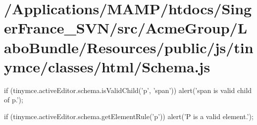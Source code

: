 \hypertarget{_2_applications_2_m_a_m_p_2htdocs_2_singer_france__s_v_n_2src_2_acme_group_2_labo_bundle_2_resou8e3613b62b7b0350ec49055cd0ec1f72}{\section{/\+Applications/\+M\+A\+M\+P/htdocs/\+Singer\+France\+\_\+\+S\+V\+N/src/\+Acme\+Group/\+Labo\+Bundle/\+Resources/public/js/tinymce/classes/html/\+Schema.\+js}
}
if (tinymce.\+active\+Editor.\+schema.\+is\+Valid\+Child('p', 'span')) alert('span is valid child of p.');

if (tinymce.\+active\+Editor.\+schema.\+get\+Element\+Rule('p')) alert('P is a valid element.');


\begin{DoxyCodeInclude}
\end{DoxyCodeInclude}
 